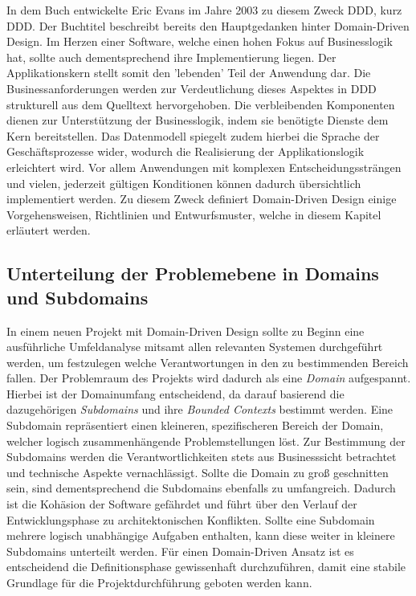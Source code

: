 In dem Buch  entwickelte Eric Evans im Jahre 2003 zu diesem Zweck \acrlong{DDD}, kurz \acrshort{DDD}. Der Buchtitel beschreibt bereits den Hauptgedanken hinter Domain-Driven Design. Im Herzen einer Software, welche einen hohen Fokus auf Businesslogik hat, sollte auch dementsprechend ihre Implementierung liegen. Der Applikationskern stellt somit den 'lebenden' Teil der Anwendung dar. Die Businessanforderungen werden zur Verdeutlichung dieses Aspektes in DDD strukturell aus dem Quelltext hervorgehoben. Die verbleibenden Komponenten dienen zur Unterstützung der Businesslogik, indem sie benötigte Dienste dem Kern bereitstellen. Das Datenmodell spiegelt zudem hierbei die Sprache der Geschäftsprozesse wider, wodurch die Realisierung der Applikationslogik erleichtert wird. Vor allem Anwendungen mit komplexen Entscheidungssträngen und vielen, jederzeit gültigen Konditionen können dadurch übersichtlich implementiert werden. Zu diesem Zweck definiert Domain-Driven Design einige Vorgehensweisen, Richtlinien und Entwurfsmuster, welche in diesem Kapitel erläutert werden. 

\subsection{Unterteilung der Problemebene in Domains und Subdomains}

In einem neuen Projekt mit Domain-Driven Design sollte zu Beginn eine ausführliche Umfeldanalyse mitsamt allen relevanten Systemen durchgeführt werden, um festzulegen welche Verantwortungen in den zu bestimmenden Bereich fallen. Der Problemraum des Projekts wird dadurch als eine \emph{Domain} aufgespannt. Hierbei ist der Domainumfang entscheidend, da darauf basierend die dazugehörigen \emph{Subdomains} und ihre \emph{Bounded Contexts} bestimmt werden. Eine Subdomain repräsentiert einen kleineren, spezifischeren Bereich der Domain, welcher logisch zusammenhängende Problemstellungen löst. Zur Bestimmung der Subdomains werden die Verantwortlichkeiten stets aus Businesssicht betrachtet und technische Aspekte vernachlässigt. Sollte die Domain zu groß geschnitten sein, sind dementsprechend die Subdomains ebenfalls zu umfangreich. Dadurch ist die Kohäsion der Software gefährdet und führt über den Verlauf der Entwicklungsphase zu architektonischen Konflikten. Sollte eine Subdomain mehrere logisch unabhängige Aufgaben enthalten, kann diese weiter in kleinere Subdomains unterteilt werden. Für einen Domain-Driven Ansatz ist es entscheidend die Definitionsphase gewissenhaft durchzuführen, damit eine stabile Grundlage für die Projektdurchführung geboten werden kann. 

